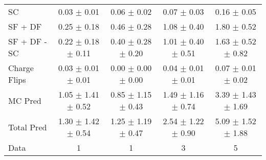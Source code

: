 \begin{tabular}{l|cccc}
                                 SC &  0.03 $\pm$  0.01 &  0.06 $\pm$  0.02 &  0.07 $\pm$  0.03 &  0.16 $\pm$  0.05 \\
                            SF + DF &  0.25 $\pm$  0.18 &  0.46 $\pm$  0.28 &  1.08 $\pm$  0.40 &  1.80 $\pm$  0.52 \\
\hline
                       SF + DF - SC &  0.22 $\pm$  0.18 $\pm$  0.11 &  0.40 $\pm$  0.28 $\pm$  0.20 &  1.01 $\pm$  0.40 $\pm$  0.51 &  1.63 $\pm$  0.52 $\pm$  0.82 \\
\hline\hline
                       Charge Flips &  0.03 $\pm$  0.01 $\pm$  0.01 &  0.00 $\pm$  0.00 $\pm$  0.00 &  0.04 $\pm$  0.01 $\pm$  0.01 &  0.07 $\pm$  0.01 $\pm$  0.02 \\
\hline
                            MC Pred &  1.05 $\pm$  1.41 $\pm$  0.52 &  0.85 $\pm$  1.15 $\pm$  0.43 &  1.49 $\pm$  1.16 $\pm$  0.74 &  3.39 $\pm$  1.43 $\pm$  1.69 \\
\hline
                         Total Pred &  1.30 $\pm$  1.42 $\pm$  0.54 &  1.25 $\pm$  1.19 $\pm$  0.47 &  2.54 $\pm$  1.22 $\pm$  0.90 &  5.09 $\pm$  1.52 $\pm$  1.88 \\
\hline\hline
                               Data &     1 &     1 &     3 &     5 \\
\hline\hline
\end{tabular}


